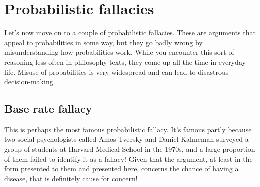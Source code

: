 


\chapter{Probabilistic fallacies}
\label{s:ProbFallacies}



Let's now move on to a couple of probabilistic fallacies. These are arguments that appeal to probabilities in some way, but they go badly wrong by misunderstanding how probabilities work. While you encounter this sort of reasoning less often in philosophy texts, they come up all the time in everyday life. Misuse of probabilities is very widespread and can lead to disastrous decision-making.

\section{Base rate fallacy}

This is perhaps the most famous probabilistic fallacy. It's famous partly because two social psychologists called Amos Tversky and Daniel Kahneman surveyed a group of students at  Harvard Medical School in the 1970s, and a large proportion of them failed to identify it as a fallacy! Given that the argument, at least in the form presented to them and presented here, concerns the chance of having a disease, that is definitely cause for concern!

